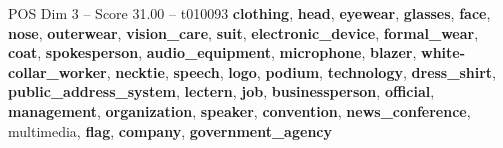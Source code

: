 \begin{textsample}{POS Dim 3 – Score 31.00 – t010093}  \label{ex:f3_pos_024}
\textbf{clothing}, \textbf{head}, \textbf{eyewear}, \textbf{glasses}, \textbf{face}, \textbf{nose}, \textbf{outerwear}, \textbf{vision\_care}, \textbf{suit}, \textbf{electronic\_device}, \textbf{formal\_wear}, \textbf{coat}, \textbf{spokesperson}, \textbf{audio\_equipment}, \textbf{microphone}, \textbf{blazer}, \textbf{white-collar\_worker}, \textbf{necktie}, \textbf{speech}, \textbf{logo}, \textbf{podium}, \textbf{technology}, \textbf{dress\_shirt}, \textbf{public\_address\_system}, \textbf{lectern}, \textbf{job}, \textbf{businessperson}, \textbf{official}, \textbf{management}, \textbf{organization}, \textbf{speaker}, \textbf{convention}, \textbf{news\_conference}, multimedia, \textbf{flag}, \textbf{company}, \textbf{government\_agency}

\end{textsample}
